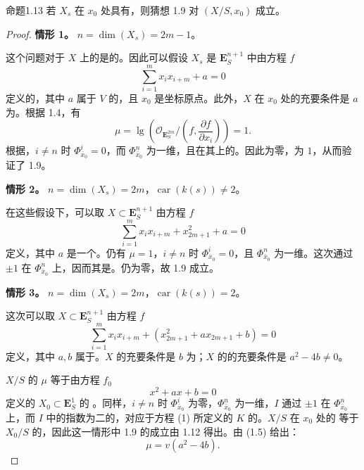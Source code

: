 \begin{SGAresult}{命题}{1.13}
若 $X_s$ 在 $x_0$ 处具有，则猜想 1.9 对 $(X/S,x_0)$ 成立。
\end{SGAresult}
\begin{proof}
\textbf{情形 1。} $n=\dim(X_s)=2m-1$。

这个问题对于 $X$ 上的是的。因此可以假设 $X_s$ 是 $\mathbf E^{n+1}_S$ 中由方程 $f$
\[
\sum_{i=1}^m x_ix_{i+m}+a=0
\]
定义的，其中 $a$ 属于 $V$ 的，且 $x_0$ 是坐标原点。此外，$X$ 在 $x_0$ 处的充要条件是 $a$ 为。根据 1.4，有
\[
\mu=\operatorname{lg}\left(\mathscr O_{\mathbf E^{2m}_S}/
\left(f,\frac{\partial f}{\partial x_i}\right)\right)=1.
\]
根据，$i\ne n$ 时 $\Phi^i_{\bar x_0}=0$，而 $\Phi^n_{\bar x_0}$ 为一维，且在其上的。因此为零，为 $1$，从而验证了 1.9。

\textbf{情形 2。} $n=\dim(X_s)=2m$，$\operatorname{car}(k(s))\ne2$。

在这些假设下，可以取 $X\subset\mathbf E^{n+1}_S$ 由方程 $f$
\[
\sum_{i=1}^m x_ix_{i+m}+x_{2m+1}^2+a=0
\]
定义，其中 $a$ 是一个。仍有 $\mu=1$，$i\ne n$ 时 $\Phi^i_{\bar x_0}=0$，且 $\Phi^n_{\bar x_0}$ 为一维。这次通过 $\pm1$ 在 $\Phi^n_{\bar x_0}$ 上，因而其是。仍为零，故 1.9 成立。

\textbf{情形 3。} $n=\dim(X_s)=2m$，$\operatorname{car}(k(s))=2$。

这次可以取 $X\subset\mathbf E^{n+1}_S$ 由方程 $f$
\[
\sum_{i=1}^m x_ix_{i+m}+(x_{2m+1}^2+ax_{2m+1}+b)=0
\]
定义，其中 $a,b$ 属于。$X$ 的充要条件是 $b$ 为；$X$ 的的充要条件是 $a^2-4b\ne0$。

$X/S$ 的  $\mu$ 等于由方程 $f_0$
\[
x^2+ax+b=0
\tag{1}
\]
定义的 $X_0\subset\mathbf E^1_S$ 的 。同样，$i\ne n$ 时 $\Phi^i_{\bar x_0}$ 为零，$\Phi^n_{\bar x_0}$ 为一维，$I$ 通过 $\pm1$ 在 $\Phi^n_{\bar x_0}$ 上，而 $I$ 中的指数为二的，对应于方程 (1) 所定义的 $K$ 的。$X/S$ 在 $x_0$ 处的
等于 $X_0/S$ 的，因此这一情形中 1.9 的成立由 1.12 得出。由 (1.5) 给出：
\[
\mu=v(a^2-4b).
\tag{1.13.1}
\]
\end{proof}

